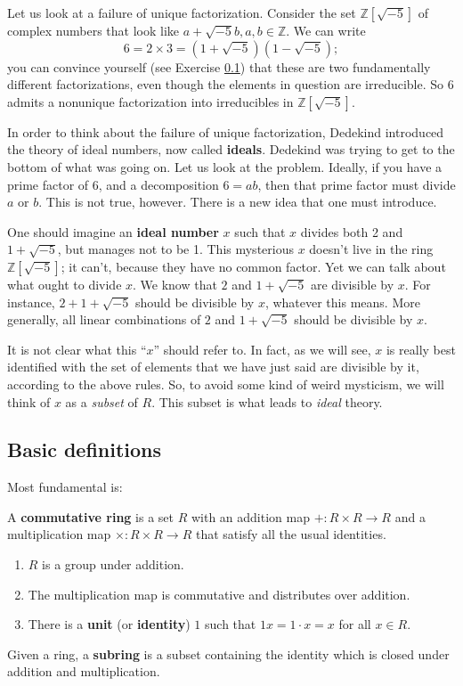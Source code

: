 Let us look at a failure of unique factorization. Consider the set
$\mathbb{Z}[\sqrt{-5}]$ of complex numbers that look like $a+\sqrt{-5}b, a, b
\in \mathbb{Z}$. We can write
  \[ 6 = 2 \times 3 = (1 + \sqrt{-5 })(1 - \sqrt{-5}); \]
you can convince yourself (see Exercise \ref{}) that these are two
fundamentally different factorizations, even though the elements in question
are irreducible. So 6 admits a nonunique factorization into irreducibles in
$\mathbb{Z}[\sqrt{-5}]$.

In order to think about the failure of unique factorization, Dedekind
introduced the theory of ideal numbers, now called \textbf{ideals}. Dedekind
was trying to get to the bottom of what was going on. Let us look at the
problem. Ideally, if you have a prime factor of $6$, and a decomposition $6 =
ab$, then that prime factor must divide $a$ or $b$. This is not true, however.
There is a new idea that one must introduce.

One should imagine an \textbf{ideal number} $x$ such that $x$ divides both 2
and $1+\sqrt{-5}$, but manages not to be 1. This mysterious $x$ doesn't live in
the ring $\mathbb{Z}[\sqrt{-5}]$; it can't, because they have no common factor.
Yet we can talk about what ought to divide $x$. We know that $2$ and
$1+\sqrt{-5}$ are divisible by $x$. For instance, $2 + 1+ \sqrt{-5}$ should be
divisible by $x$, whatever this means. More generally, all linear combinations
of $2$ and $1+\sqrt{-5}$ should be divisible by $x$.

It is not clear what this ``$x$'' should refer to. In fact, as we will see, $x$
is really best identified with the set of elements that we have just said are
divisible by it, according to the above rules. So, to avoid some kind of weird
mysticism, we will think of $x$ as a \emph{subset} of $R$. This subset is what
leads to \emph{ideal} theory.

\subsection{Basic definitions}

Most fundamental is:

\begin{definition}
A \textbf{commutative ring} is a set $R$ with an addition map $+:R \times R \to
R$ and a multiplication map $\times: R \times R \to R$ that satisfy all the
usual identities.

\begin{enumerate}[\textbf{R} 1]
  \item $R$ is a group under addition.
  \item The multiplication map is commutative and distributes over addition.
  \item There is a \textbf{unit} (or \textbf{identity}) $1$ such that $1x = 1
        \cdot x = x$ for all $x \in R$.
\end{enumerate}

Given a ring, a \textbf{subring} is a subset containing the identity which is
closed under addition and multiplication.
\end{definition}

